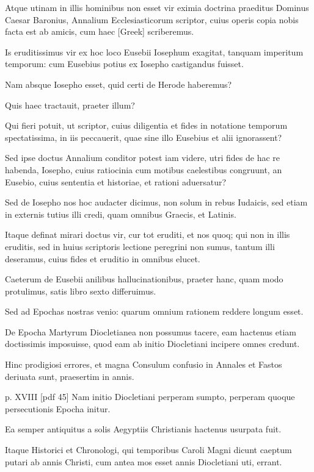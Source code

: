 \begin{parnumbers}
Atque utinam in illis hominibus
non esset vir eximia doctrina praeditus Dominus Caesar Baronius,
Annalium Ecclesiasticorum scriptor, cuius operis copia nobis
facta est ab amicis, cum haec \textgreek{[Greek]} scriberemus.

Is eruditissimus
vir ex hoc loco Eusebii Iosephum exagitat, tanquam imperitum
temporum: cum Eusebius potius ex Iosepho castigandus fuisset.

Nam absque Iosepho esset, quid certi de Herode haberemus?

Quis haec tractauit, praeter illum?

Qui fieri potuit, ut scriptor, cuius diligentia
et fides in notatione temporum spectatissima, in iis peccauerit,
quae sine illo Eusebius et alii ignorassent?

Sed ipse doctus Annalium
conditor potest iam videre, utri fides de hac re habenda, Iosepho,
cuius ratiocinia cum motibus caelestibus congruunt, an Eusebio,
cuius sententia et historiae, et rationi aduersatur?

Sed de Iosepho
nos hoc audacter dicimus, non solum in rebus Iudaicis, sed etiam
in externis tutius illi credi, quam omnibus Graecis, et Latinis.

Itaque
definat mirari doctus vir, cur tot eruditi, et nos quoq; qui non in illis
eruditis, sed in huius scriptoris lectione peregrini non sumus, tantum
illi deseramus, cuius fides et eruditio in omnibus elucet.

Caeterum de Eusebii anilibus hallucinationibus, praeter hanc, quam
modo protulimus, satis libro sexto differuimus.

Sed ad Epochas
nostras venio: quarum omnium rationem reddere longum esset.

De Epocha Martyrum Diocletianea non possumus tacere, eam hactenus
etiam doctissimis imposuisse, quod eam ab initio Diocletiani
incipere omnes credunt.

Hinc prodigiosi errores, et magna Consulum
confusio in Annales et Fastos deriuata sunt, praesertim in annis.

\clearpage
p. XVIII [pdf 45]
Nam initio Diocletiani perperam sumpto, perperam quoque
persecutionis Epocha initur.

Ea semper antiquitus a solis Aegyptiis
Christianis hactenus usurpata fuit.

Itaque Historici et Chronologi,
qui temporibus Caroli Magni dicunt caeptum putari ab annis
Christi, cum antea mos esset annis Diocletiani uti, errant.


\end{parnumbers}

